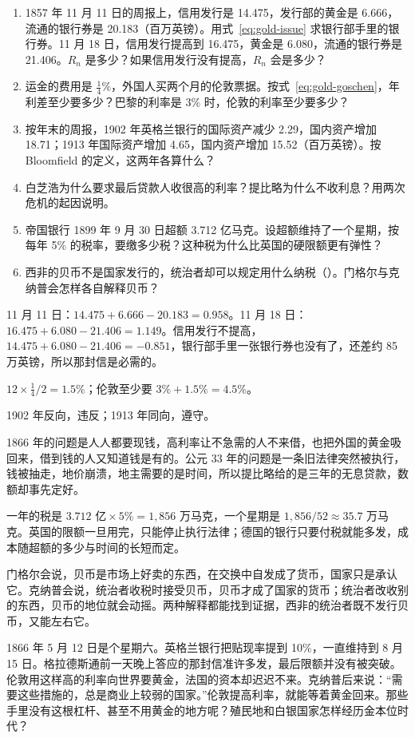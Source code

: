 \begin{selfcheck}
\begin{enumerate}
\item 1857 年 11 月 11 日的周报上，信用发行是 14.475，发行部的黄金是 6.666，流通的银行券是 20.183（百万英镑）。用式~\eqref{eq:gold-issue} 求银行部手里的银行券。11 月 18 日，信用发行提高到 16.475，黄金是 6.080，流通的银行券是 21.406。$R_n$ 是多少？如果信用发行没有提高，$R_n$ 会是多少？
\item 运金的费用是 $\tfrac14\%$，外国人买两个月的伦敦票据。按式~\eqref{eq:gold-goschen}，年利差至少要多少？巴黎的利率是 3\% 时，伦敦的利率至少要多少？
\item 按年末的周报，1902 年英格兰银行的国际资产减少 2.29，国内资产增加 18.71；1913 年国际资产增加 4.65，国内资产增加 15.52（百万英镑）。按 Bloomfield 的定义，这两年各算什么？
\item 白芝浩为什么要求最后贷款人收很高的利率？提比略为什么不收利息？用两次危机的起因说明。
\item 帝国银行 1899 年 9 月 30 日超额 3.712 亿马克。设超额维持了一个星期，按每年 5\% 的税率，要缴多少税？这种税为什么比英国的硬限额更有弹性？
\item 西非的贝币不是国家发行的，统治者却可以规定用什么纳税（）。门格尔与克纳普会怎样各自解释贝币？
\end{enumerate}
\end{selfcheck}

\begin{answers}
\item 11 月 11 日：$14.475+6.666-20.183=0.958$。11 月 18 日：$16.475+6.080-21.406=1.149$。信用发行不提高，$14.475+6.080-21.406=-0.851$，银行部手里一张银行券也没有了，还差约 85 万英镑，所以那封信是必需的。
\item $12\times\tfrac14/2=1.5\%$；伦敦至少要 $3\%+1.5\%=4.5\%$。
\item 1902 年反向，违反；1913 年同向，遵守。
\item 1866 年的问题是人人都要现钱，高利率让不急需的人不来借，也把外国的黄金吸回来，借到钱的人又知道钱是有的。公元 33 年的问题是一条旧法律突然被执行，钱被抽走，地价崩溃，地主需要的是时间，所以提比略给的是三年的无息贷款，数额却事先定好。
\item 一年的税是 $3.712\text{ 亿}\times5\%=1{,}856$ 万马克，一个星期是 $1{,}856/52\approx35.7$ 万马克。英国的限额一旦用完，只能停止执行法律；德国的银行只要付税就能多发，成本随超额的多少与时间的长短而定。
\item 门格尔会说，贝币是市场上好卖的东西，在交换中自发成了货币，国家只是承认它。克纳普会说，统治者收税时接受贝币，贝币才成了国家的货币；统治者改收别的东西，贝币的地位就会动摇。两种解释都能找到证据，西非的统治者既不发行贝币，又能左右它。
\end{answers}

1866 年 5 月 12 日是个星期六。英格兰银行把贴现率提到 10\%，一直维持到 8 月 15 日\cite{boe2017}。格拉德斯通前一天晚上答应的那封信准许多发，最后限额并没有被突破\cite{andreades1909}。伦敦用这样高的利率向世界要黄金，法国的资本却迟迟不来\cite{andreades1909}。克纳普后来说：“需要这些措施的，总是商业上较弱的国家。”\cite{knapp1924}伦敦提高利率，就能等着黄金回来。那些手里没有这根杠杆、甚至不用黄金的地方呢？殖民地和白银国家怎样经历金本位时代？
